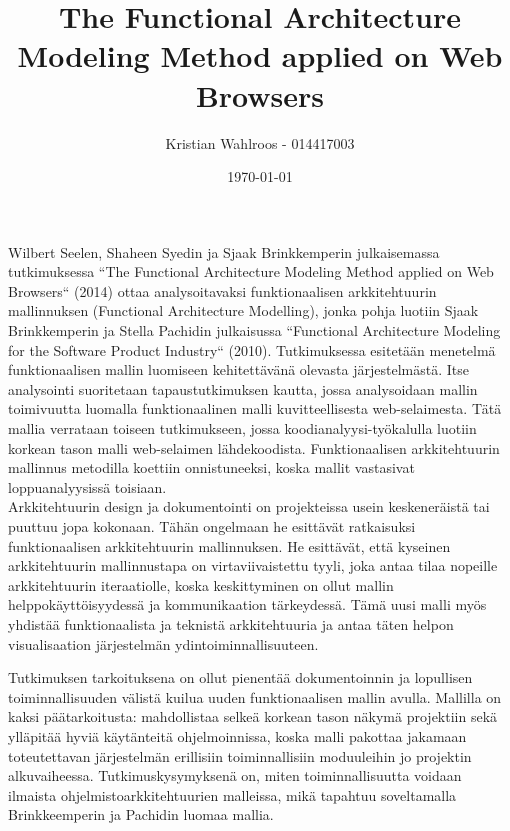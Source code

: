 \documentclass[finnish]{tktltiki2}
\title{The Functional Architecture Modeling Method applied on Web Browsers}
\author{Kristian Wahlroos - 014417003}
\date{\today}
\theoremstyle{definition}
\theoremstyle{remark}
\begin{document}

\frontmatter      %

 \maketitle        %



\mainmatter       %


Wilbert Seelen, Shaheen Syedin ja Sjaak Brinkkemperin julkaisemassa tutkimuksessa ``The Functional Architecture Modeling Method applied on Web Browsers`` (2014) ottaa analysoitavaksi funktionaalisen arkkitehtuurin mallinnuksen (Functional Architecture Modelling), jonka pohja luotiin Sjaak Brinkkemperin ja Stella Pachidin julkaisussa ``Functional Architecture Modeling for the Software Product Industry`` (2010). Tutkimuksessa esitetään menetelmä  funktionaalisen mallin luomiseen kehitettävänä olevasta järjestelmästä. Itse analysointi suoritetaan tapaustutkimuksen kautta, jossa analysoidaan mallin toimivuutta luomalla funktionaalinen malli kuvitteellisesta web-selaimesta. Tätä mallia verrataan toiseen tutkimukseen, jossa koodianalyysi-työkalulla luotiin korkean tason malli web-selaimen lähdekoodista. Funktionaalisen arkkitehtuurin mallinnus metodilla koettiin onnistuneeksi, koska mallit vastasivat loppuanalyysissä toisiaan.\\

Arkkitehtuurin design ja dokumentointi on projekteissa usein keskeneräistä tai puuttuu jopa kokonaan. Tähän ongelmaan he esittävät ratkaisuksi funktionaalisen arkkitehtuurin mallinnuksen. He esittävät, että kyseinen arkkitehtuurin mallinnustapa on virtaviivaistettu tyyli, joka antaa tilaa nopeille arkkitehtuurin iteraatiolle, koska keskittyminen on ollut mallin helppokäyttöisyydessä ja kommunikaation tärkeydessä. Tämä uusi malli myös yhdistää funktionaalista ja teknistä arkkitehtuuria ja antaa täten helpon visualisaation järjestelmän ydintoiminnallisuuteen.  

Tutkimuksen tarkoituksena on ollut pienentää dokumentoinnin ja lopullisen toiminnallisuuden välistä kuilua uuden funktionaalisen mallin avulla. Mallilla on kaksi päätarkoitusta: mahdollistaa selkeä korkean tason näkymä projektiin sekä ylläpitää hyviä käytänteitä ohjelmoinnissa, koska malli pakottaa jakamaan toteutettavan järjestelmän erillisiin toiminnallisiin moduuleihin jo projektin alkuvaiheessa. Tutkimuskysymyksenä on, miten toiminnallisuutta voidaan ilmaista ohjelmistoarkkitehtuurien malleissa, mikä tapahtuu soveltamalla Brinkkeemperin ja Pachidin luomaa mallia. 
\end{document}
